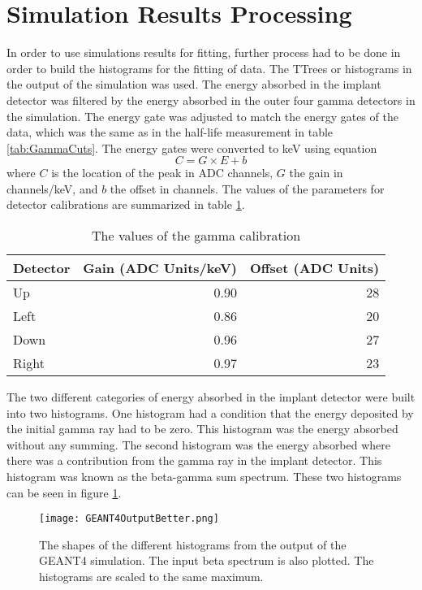 \documentclass[../MaxHughesThesis.tex]{subfiles}
\begin{document}
\section{Simulation Results Processing}
In order to use simulations results for fitting, further process had to be done in order to build the histograms for the fitting of data.
The TTrees or histograms in the output of the simulation was used.
The energy absorbed in the implant detector was filtered by the energy absorbed in the outer four gamma detectors in the simulation.
The energy gate was adjusted to match the energy gates of the data, which was the same as in the half-life measurement in table \ref{tab:GammaCuts}.
The energy gates were converted to keV using equation
\begin{equation}
        C = G \times E + b
        \label{eq:cal}
\end{equation}
where $C$ is the location of the peak in ADC channels, $G$ the gain in channels/keV, and $b$ the offset in channels.
The values of the parameters for detector calibrations are summarized in table \ref{tab:gammadetcal}.

\begin{table}[!hbt]
        \centering
        \caption{The values of the gamma calibration}
                \begin{tabular}{lrr}
                Detector & Gain (ADC Units/keV) & Offset (ADC Units) \\ \hline
                Up & 0.90 & 28 \\
                Left & 0.86 & 20 \\
                Down & 0.96 & 27 \\
                Right & 0.97 & 23
                \end{tabular}
                \label{tab:gammadetcal}
\end{table}
The two different categories of energy absorbed in the implant detector were built into two histograms.
One histogram had a condition that the energy deposited by the initial gamma ray had to be zero.
This histogram was the energy absorbed without any summing.
The second histogram was the energy absorbed where there was a contribution from the gamma ray in the implant detector.
This histogram was known as the beta-gamma sum spectrum.
These two histograms can be seen in figure \ref{fig:GEANT4Hists}.
\begin{figure}[!htb]
        \centerline{\texttt{[image: GEANT4OutputBetter.png]}}
        \caption{The shapes of the different histograms from the output of the GEANT4 simulation.
                 The input beta spectrum is also plotted.
                 The histograms are scaled to the same maximum.}
        \label{fig:GEANT4Hists}
\end{figure}
\end{document}
